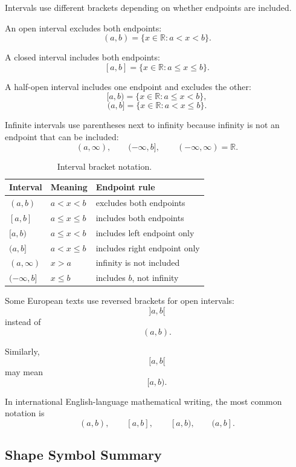\documentclass[11pt,twocolumn]{article}
\newcommand{\R}{\mathbb{R}}
\begin{document}
Intervals use different brackets depending on whether endpoints are included.

An open interval excludes both endpoints:
\[
(a,b)
=
\{x\in\R : a<x<b\}.
\]

A closed interval includes both endpoints:
\[
[a,b]
=
\{x\in\R : a\le x\le b\}.
\]

A half-open interval includes one endpoint and excludes the other:
\[
[a,b)
=
\{x\in\R : a\le x<b\},
\]
\[
(a,b]
=
\{x\in\R : a<x\le b\}.
\]

Infinite intervals use parentheses next to infinity because infinity is not an
endpoint that can be included:
\[
(a,\infty),
\qquad
(-\infty,b],
\qquad
(-\infty,\infty)=\R.
\]

\begin{table}[ht]
\centering
\small
\caption{Interval bracket notation.}
\begin{tabular}{lll}
\toprule
Interval & Meaning & Endpoint rule \\
\midrule
$(a,b)$ & \(a<x<b\) & excludes both endpoints \\
$[a,b]$ & \(a\le x\le b\) & includes both endpoints \\
$[a,b)$ & \(a\le x<b\) & includes left endpoint only \\
$(a,b]$ & \(a<x\le b\) & includes right endpoint only \\
$(a,\infty)$ & \(x>a\) & infinity is not included \\
$(-\infty,b]$ & \(x\le b\) & includes \(b\), not infinity \\
\bottomrule
\end{tabular}
\end{table}

Some European texts use reversed brackets for open intervals:
\[
]a,b[
\]
instead of
\[
(a,b).
\]

Similarly,
\[
[a,b[
\]
may mean
\[
[a,b).
\]

In international English-language mathematical writing, the most common
notation is
\[
(a,b),
\qquad
[a,b],
\qquad
[a,b),
\qquad
(a,b].
\]

\subsection{Shape Symbol Summary}
\end{document}

